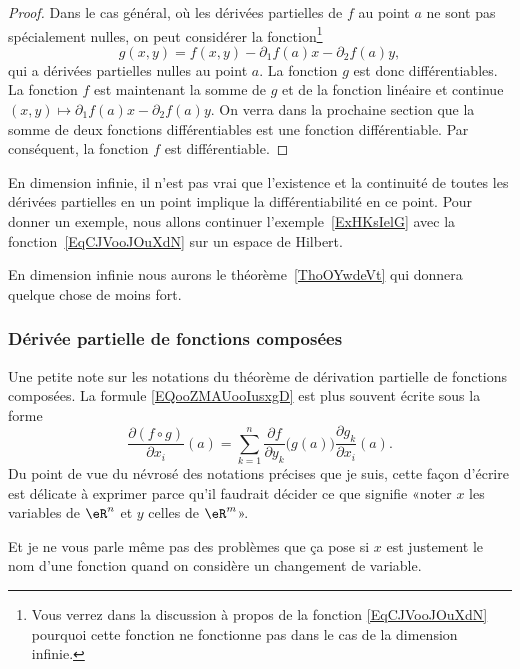 \begin{proof}
    Dans le cas général, où les dérivées partielles de $f$ au point $a$ ne sont pas spécialement nulles, on peut considérer la fonction\footnote{Vous verrez dans la discussion à propos de la fonction \eqref{EqCJVooJOuXdN} pourquoi cette fonction ne fonctionne pas dans le cas de la dimension infinie.}
    \begin{equation}    \label{EqXHVooJeQKrB}
        g(x,y)=f(x,y)-\partial_1 f(a)x-\partial_2 f(a)y,
    \end{equation}
    qui a dérivées partielles nulles au point $a$. La fonction $g$ est donc différentiables. La fonction $f$ est maintenant la somme de $g$ et de la fonction linéaire et continue $(x,y)\mapsto \partial_1 f(a)x-\partial_2 f(a)y$. On verra dans la prochaine section que la somme de deux fonctions différentiables est une fonction différentiable. Par conséquent, la fonction $f$ est différentiable.
\end{proof}

\begin{remark}
    En dimension infinie, il n'est pas vrai que l'existence et la continuité de toutes les dérivées partielles en un point implique la différentiabilité en ce point. Pour donner un exemple, nous allons continuer l'exemple~\ref{ExHKsIelG}
    avec la fonction~\ref{EqCJVooJOuXdN} sur un espace de Hilbert.

    En dimension infinie nous aurons le théorème~\ref{ThoOYwdeVt} qui donnera quelque chose de moins fort.
\end{remark}

\subsubsection{Dérivée partielle de fonctions composées}

\begin{normaltext}
    Une petite note sur les notations du théorème de dérivation partielle de fonctions composées. La formule \eqref{EQooZMAUooIusxgD} est plus souvent écrite sous la forme
    \begin{equation}
		\frac{ \partial (f\circ g) }{ \partial x_i }(a)=\sum_{k=1}^n\frac{ \partial f }{ \partial y_k }\big( g(a) \big)\frac{ \partial g_k }{ \partial x_i }(a).
    \end{equation}
    Du point de vue du névrosé des notations précises que je suis, cette façon d'écrire est délicate à exprimer parce qu'il faudrait décider ce que signifie «noter \( x\) les variables de \( \eR^n\) et \( y\) celles de \( \eR^m\)».

    Et je ne vous parle même pas des problèmes que ça pose si \( x\) est justement le nom d'une fonction quand on considère un changement de variable.
\end{normaltext}

